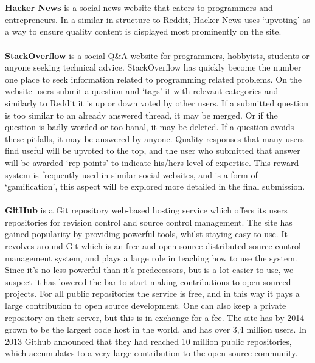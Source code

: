 \documentclass[a4paper,11pt]{scrartcl}
\begin{document}
\\\\
\textbf{Hacker News} is a social news website that caters to programmers and entrepreneurs. In a similar in structure to Reddit, Hacker News uses ‘upvoting’ as a way to ensure quality content is displayed most prominently on the site.
\\\\
\textbf{StackOverflow} is a social Q\&A website for programmers, hobbyists, students or anyone seeking technical advice. StackOverflow has quickly become the number one place to seek information related to programming related problems. On the website users submit a question and ‘tags’ it with relevant categories and similarly to Reddit it is up or down voted by other users. If a submitted question is too similar to an already answered thread, it may be merged. Or if the question is badly worded or too banal, it may be deleted. If a question avoids these pitfalls, it may be answered by anyone. Quality responses that many users find useful will be upvoted to the top, and the user who submitted that answer will be awarded ‘rep points’ to indicate his/hers level of expertise. This reward system is frequently used in similar social websites, and is a form of ‘gamification’, this aspect will be explored more detailed in the final submission.
\\\\
\textbf{GitHub} is a Git repository web-based hosting service which offers its users repositories for revision control and source control management. The site has gained popularity by providing powerful tools, whilst staying easy to use. It revolves around Git which is an free and open source distributed source control management system, and plays a large role in teaching how to use the system. Since it’s no less powerful than it’s predecessors, but is a lot easier to use, we suspect it has lowered the bar to start making contributions to open sourced projects. For all public repositories the service is free, and in this way it pays a large contribution to open source development. One can also keep a private repository on their server, but this is in exchange for a fee. The site has by 2014 grown to be the largest code host in the world, and has over 3,4 million users. In 2013 Github announced that they had reached 10 million public repositories, which accumulates to a very large contribution to the open source community.








\newpage{}

 
\end{document}

